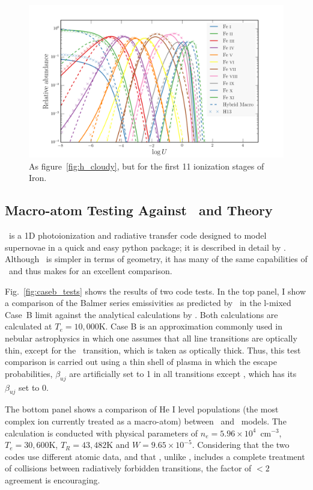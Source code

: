 \begin{figure}
\centering
\includegraphics[width=1.0\textwidth]{figures/03-radtrans/ir_comp.png}
\caption
{
As figure~\ref{fig:h_cloudy}, but for the first 11 ionization stages of Iron.
}
\label{fig:ir_cloudy}
\end{figure}

\subsection{Macro-atom Testing Against \tar\ and Theory}

\tar\ is a 1D photoionization and radiative transfer code designed to
model supernovae in a quick and easy python package; it is described in detail by
\cite{kerzendorfsim}. Although \tar\ is simpler in terms
of geometry, it has many of the same capabilities of \py\ and 
thus makes for an excellent comparison. 

Fig.~\ref{fig:caseb_tests} shows the results of two code tests. 
In the top panel, I show a comparison of the Balmer series 
emissivities as predicted by \py\ in the l-mixed Case~B limit against the
analytical calculations by \cite{seaton1959}. 
Both calculations are calculated at $T_e=10,000$K.
Case B is an approximation commonly used in nebular astrophysics 
\citep[see e.g.][]{osterbrock} in which
one assumes that all line transitions are optically thin, except
for the \la\ transition, which is taken as optically thick.
Thus, this test comparison is carried out using a thin shell
of plasma in which the escape probabilities, $\beta_{uj}$ 
are artificially set to 1 in all transitions except \la, which
has its $\beta_{uj}$ set to 0.

The bottom panel shows a comparison of He I level populations 
(the most complex ion currently 
treated as a macro-atom) between \py\ and \tar\ models.
The calculation is conducted with physical parameters of $n_e=5.96\times10^4$~cm$^{-3}$,
$T_e=30,600$K, $T_R=43,482$K and $W=9.65\times10^{-5}$. 
Considering that the two codes use different atomic data, and that
\tar, unlike \py, includes a 
complete treatment of collisions between 
radiatively forbidden transitions, the factor of 
$<2$ agreement is encouraging. 

